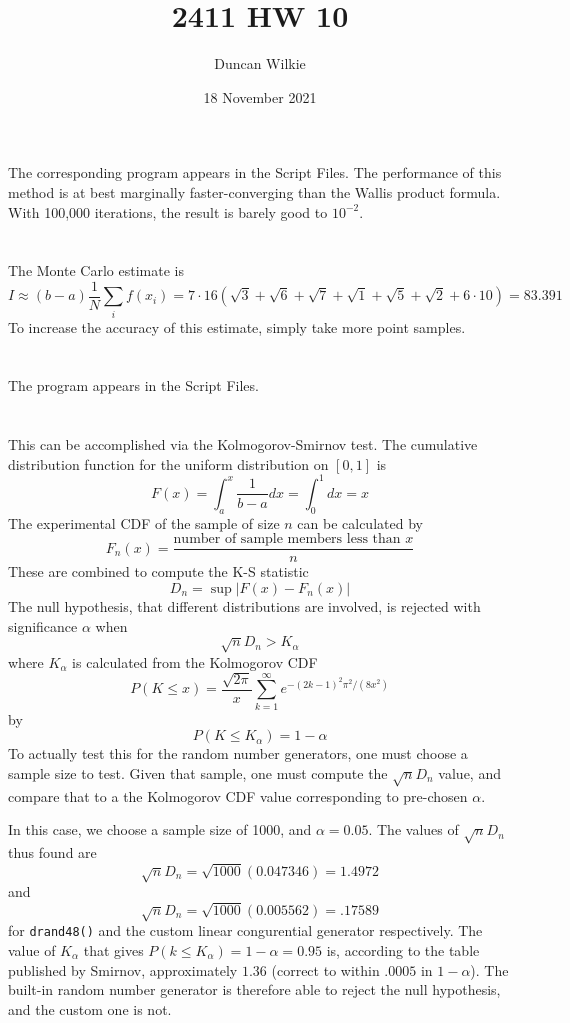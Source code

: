 \documentclass{article}
\title{2411 HW 10}
\author{Duncan Wilkie}
\date{18 November 2021}
\begin{document}
\maketitle

\section{}
The corresponding program appears in the Script Files. The performance of this method is at best marginally faster-converging than the Wallis product formula. With 100,000 iterations, the result is barely good to $10^{-2}$.

\section{}
The Monte Carlo estimate is
\[I\approx (b-a)\frac{1}{N}\sum_if(x_i)=7\cdot{1}{6}\left( \sqrt{3}+\sqrt{6}+\sqrt{7}+\sqrt{1}+\sqrt{5}+\sqrt{2}+6\cdot10 \right)=83.391\]
To increase the accuracy of this estimate, simply take more point samples.

\section{}
The program appears in the Script Files.

\section{}
This can be accomplished via the Kolmogorov-Smirnov test. The cumulative distribution function for the uniform distribution on $[0,1]$ is
\[F(x)=\int_a^x\frac{1}{b-a}dx=\int_0^1dx=x\]
The experimental CDF of the sample of size $n$ can be calculated by
\[F_n(x)=\frac{\textrm{number of sample members less than }x}{n}\]
These are combined to compute the K-S statistic
\[D_n=\sup|F(x)-F_n(x)|\]
The null hypothesis, that different distributions are involved, is rejected with significance $\alpha$ when
\[\sqrt{n}D_n>K_\alpha\]
where $K_\alpha $ is calculated from the Kolmogorov CDF
\[P(K\leq x)= \frac{\sqrt{2\pi}}{x}\sum_{k=1}^\infty e^{-(2k-1)^2\pi^2/(8x^2)}\]
by
\[P(K\leq K_\alpha)=1-\alpha\]
To actually test this for the random number generators, one must choose a sample size to test. Given that sample, one must compute the $\sqrt{n}D_n$ value, and compare that to a the Kolmogorov CDF value corresponding to pre-chosen $\alpha$.

In this case, we choose a sample size of 1000, and $\alpha=0.05$. The values of $\sqrt{n}D_n$ thus found are
\[\sqrt{n}D_n=\sqrt{1000}(0.047346)=1.4972\]
and
\[\sqrt{n}D_n=\sqrt{1000}(0.005562)=.17589\]
for \verb|drand48()| and the custom linear congurential generator respectively. The value of $K_\alpha$ that gives $P(k\leq K_\alpha) = 1-\alpha=0.95$ is, according to the table published by Smirnov, approximately $1.36$ (correct to within $.0005$ in $1-\alpha$). The built-in random number generator is therefore able to reject the null hypothesis, and the custom one is not.
\end{document}

